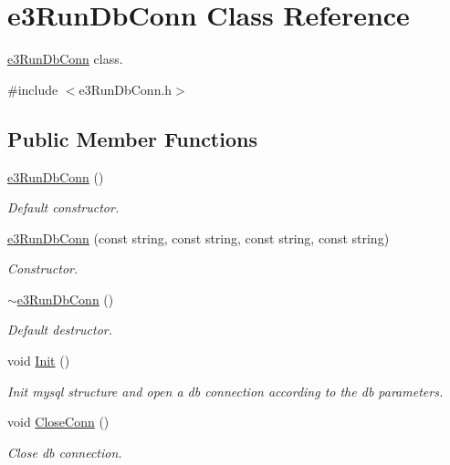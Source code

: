 \hypertarget{classe3RunDbConn}{
\section{e3RunDbConn Class Reference}
\label{classe3RunDbConn}
}


\hyperlink{classe3RunDbConn}{e3RunDbConn} class.  


{\ttfamily \#include $<$e3RunDbConn.h$>$}\subsection*{Public Member Functions}
\begin{DoxyCompactItemize}
\item 
\hyperlink{classe3RunDbConn_a3b9a10475acdd79085b58a919dc66835}{e3RunDbConn} ()
\begin{DoxyCompactList}\small\item\em Default constructor. \item\end{DoxyCompactList}\item 
\hyperlink{classe3RunDbConn_a58fbb7176357f93c0e576bc4feffcc26}{e3RunDbConn} (const string, const string, const string, const string)
\begin{DoxyCompactList}\small\item\em Constructor. \item\end{DoxyCompactList}\item 
\hyperlink{classe3RunDbConn_a9ba77cdf2ee9a6097344b8280c2473a1}{$\sim$e3RunDbConn} ()
\begin{DoxyCompactList}\small\item\em Default destructor. \item\end{DoxyCompactList}\item 
void \hyperlink{classe3RunDbConn_a1b4a0a5ec2ccd5deb5e042fa698ae872}{Init} ()
\begin{DoxyCompactList}\small\item\em Init mysql structure and open a db connection according to the db parameters. \item\end{DoxyCompactList}\item 
void \hyperlink{classe3RunDbConn_a1318d5a0927f864cb91d15a86592b595}{CloseConn} ()
\begin{DoxyCompactList}\small\item\em Close db connection. \item\end{DoxyCompactList}\item 

\end{DoxyCompactItemize}
